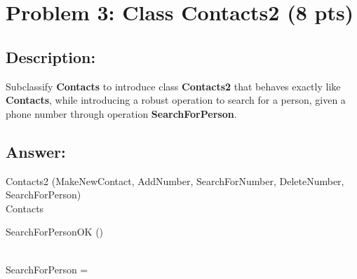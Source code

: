 \newpage
\section{Problem 3: Class Contacts2 (8 pts)}

\subsection{Description:}
Subclassify \textbf{Contacts} to introduce class \textbf{Contacts2} that behaves exactly like \textbf{Contacts},
while introducing a robust operation to search for a person, given a phone number through
operation \textbf{SearchForPerson}.

\subsection{Answer:}

\begin{class}{Contacts2}
\also
\upharpoonright (MakeNewContact, AddNumber, SearchForNumber, DeleteNumber,\\ SearchForPerson) \\
Contacts\\
\begin{op}{SearchForPersonOK}
\Xi () \\
\ST
\end{op}\\
\also
SearchForPerson = 
\end{class}